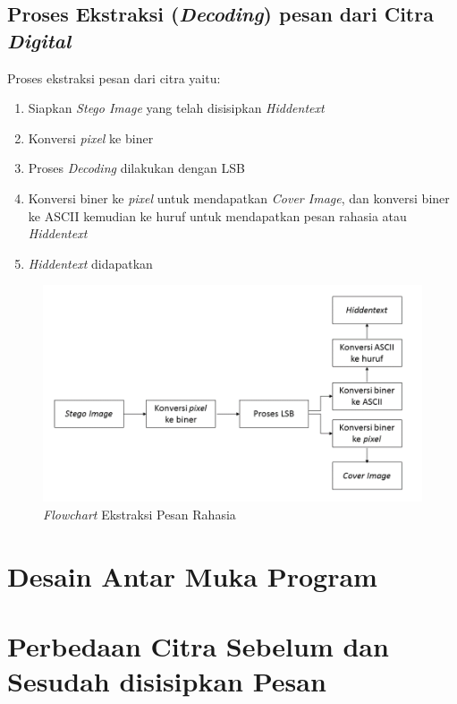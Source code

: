 	\subsection{Proses Ekstraksi (\emph{Decoding}) pesan dari Citra \emph{Digital}}
	Proses ekstraksi pesan dari citra yaitu:
	\begin{enumerate}
		\item Siapkan \emph{Stego Image} yang telah disisipkan \emph{Hiddentext}
		\item Konversi \emph{pixel} ke biner
		\item Proses \emph{Decoding} dilakukan dengan LSB
		\item Konversi biner ke \emph{pixel} untuk mendapatkan \emph{Cover Image}, dan konversi biner ke ASCII kemudian ke huruf untuk mendapatkan pesan rahasia atau \emph{Hiddentext}
		\item \emph{Hiddentext} didapatkan
	\end{enumerate}
	
	\begin{figure}[H]
		\centering
		\includegraphics[width=1\textwidth]{gambar/ekstraksi2}
		\caption{\emph{Flowchart} Ekstraksi Pesan Rahasia}
		\label{flowchart_ekstraksi}
	\end{figure}
	
\section{Desain Antar Muka Program}
\section{Perbedaan Citra Sebelum dan Sesudah disisipkan Pesan}
